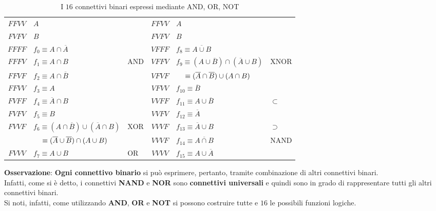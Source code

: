 \documentclass[a4paper]{extarticle}
\renewcommand\arraystretch{}
\begin{document}
\begin{table}[H]
    \centering
    \setlength{\tabcolsep}{8pt}
    \renewcommand{\arraystretch}{2}
    \begin{tabularx}{\textwidth}{|c|l|>{\textwidth}P||c|l|>{\textwidth}P|}
    \hline
         $FFVV$ & $A$ & $ $ & $FFVV$ & $A$ & $ $\\
         $FVFV$ & $B$ & $ $ & $FVFV$ & $B$ & $ $\\
         \hline
         \hline
         $FFFF$ & $f_{0} \equiv A \cap \overline{A}$ & $ $ & $VFFF$ & $f_{8} \equiv \overline{A \cup B}$ &$ $\\
         $FFFV$ & $f_{1} \equiv A \cap B $ & $\text{AND}$ & $VFFV $ & $f_{9} \equiv (A \cup \overline{B}) \cap (\overline{A} \cup B)$ & $\text{XNOR}$\\
         $FFVF$ & $f_{2} \equiv A \cap \overline{B} $ & $ $ & $VFVF $ & $\hspace{1.2em} \equiv (\overline{A} \cap \overline{B}) \cup (A \cap B)$ & $ $\\
         $FFVV$ & $f_{3} \equiv A $ & $ $ & $VFVV$ & $ f_{10} \equiv \overline{B}$ & $ $\\
         $FVFF$ & $f_{4} \equiv \overline{A} \cap B $ & $ $ & $VVFF $ & $f_{11} \equiv A \cup \overline{B}$ & $\subset$\\
         $FVFV$ & $f_{5} \equiv B $ & $ $ & $VVFV$ & $f_{12} \equiv \overline{A}$ & $ $\\
         $FVVF$ & $f_{6} \equiv (A \cap \overline{B}) \cup (\overline{A} \cap B)$ & $\text{XOR}$ & $VVVF$ & $f_{13} \equiv \overline{A} \cup B$ & $\supset$\\
         $ $ & $\hspace{1.2em} \equiv (\overline{A} \cup \overline{B}) \cap (A \cup B) $ & $ $ & $VVVF$ & $f_{14} \equiv \overline{A \cap B} $ & $\text{NAND}$\\
         $FVVV$ & $f_{7} \equiv A \cup B $ & $\text{OR}$ & $VVVV$ & $f_{15} \equiv A \cup \overline{A} $ & $ $\\
         \hline
    \end{tabularx}
    \caption{I \(16\) connettivi binari espressi mediante AND, OR, NOT}
    \label{tab:connettivi_espressi_con_AND_OR_NOT}
\end{table}

\noindent
\textbf{Osservazione}: \textbf{Ogni connettivo binario} si può esprimere, pertanto, tramite combinazione di altri connettivi binari.\\
Infatti, come si è detto, i connettivi \textbf{NAND} e \textbf{NOR} sono \textbf{connettivi universali} e quindi sono in grado di rappresentare tutti gli altri connettivi binari.\\
Si noti, infatti, come utilizzando \textbf{AND}, \textbf{OR} e \textbf{NOT} si possono costruire tutte e \(16\) le possibili funzioni logiche.
\end{document}
